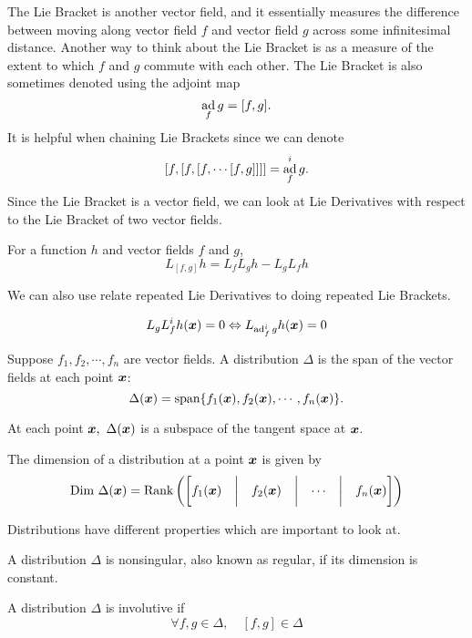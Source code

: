 The Lie Bracket is another vector field, and it essentially measures the
difference between moving along vector field $f$ and vector field $g$ across
some infinitesimal distance. Another way to think about the Lie Bracket is as a
measure of the extent to which $f$ and $g$ commute with each other. The Lie
Bracket is also sometimes denoted using the adjoint map \[
	\operatorname*{ad}_fg = [f, g].
\]
It is helpful when chaining Lie Brackets since we can denote \[
	[f,[f,[f,\cdots[f,g]]]] = \operatorname*{ad}_f^ig.
\]
Since the Lie Bracket is a vector field, we can look at Lie Derivatives with
respect to the Lie Bracket of two vector fields.
\begin{theorem}
	For a function $h$ and vector fields $f$ and $g$, \[
		L_{[f,g]}h = L_fL_gh - L_gL_fh
	\]
	\label{thm:lie-brack-derivative}
\end{theorem}
We can also use relate repeated Lie Derivatives to doing repeated Lie Brackets.
\begin{theorem}
	\[
		L_gL_f^ih(\boldsymbol{x}) = 0 \Leftrightarrow L_{\operatorname*{ad}_f^ig}h(\boldsymbol{x}) = 0
	\]
	\label{thm:repeated-lie}
\end{theorem}
\begin{definition}
	Suppose $f_1,f_2,\cdots,f_n$ are vector fields. A distribution $\Delta$ is the
	span of the vector fields at each point $\boldsymbol{x}$: \[
		\Delta(\boldsymbol{x}) = \text{span}\{f_1(\boldsymbol{x}), f_2(\boldsymbol{x}),\cdots,f_n(\boldsymbol{x})\}.
	\]
	\label{defn:distribution}
\end{definition}
At each point $\bs{x},\ \Delta(\bs{x})$ is a subspace of the tangent space at
$\boldsymbol{x}$.
\begin{definition}
	The dimension of a distribution at a point $\boldsymbol{x}$ is given by \[
		\text{Dim }\Delta(\boldsymbol{x}) = \text{Rank}\left(\begin{bmatrix}
				f_1(\boldsymbol{x}) & \bigg\lvert & f_2(\boldsymbol{x}) & \bigg\lvert & \cdots &
				\bigg\lvert & f_n(\boldsymbol{x})
		\end{bmatrix}\right)
	\]
	\label{defn:distribution-dimension}
\end{definition}
Distributions have different properties which are important to look at.
\begin{definition}
	A distribution $\Delta$ is nonsingular, also known as regular, if its
	dimension is constant.
	\label{defn:regular-dimension}
\end{definition}
\begin{definition}
	A distribution $\Delta$ is involutive if \[
		\forall f, g\in \Delta, \quad [f, g] \in \Delta
	\]
	\label{defn:involutive-distribution}
\end{definition}
